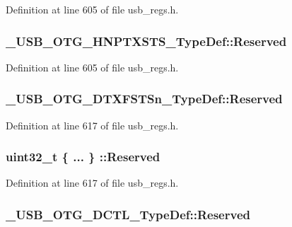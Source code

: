Definition at line 605 of file usb\-\_\-regs.\-h.

\hypertarget{group___u_s_b___o_t_g___d_r_i_v_e_r_ga0b02a3404c6ad41176f49181c017ca7c}{
\subsubsection[{Reserved}]{ \-\_\-\-U\-S\-B\-\_\-\-O\-T\-G\-\_\-\-H\-N\-P\-T\-X\-S\-T\-S\-\_\-\-Type\-Def\-::\-Reserved}}\label{group___u_s_b___o_t_g___d_r_i_v_e_r_ga0b02a3404c6ad41176f49181c017ca7c}


Definition at line 605 of file usb\-\_\-regs.\-h.

\hypertarget{group___u_s_b___o_t_g___d_r_i_v_e_r_gac897a0ce4a1b6cdba39c3fcf36948dc8}{
\subsubsection[{Reserved}]{ \-\_\-\-U\-S\-B\-\_\-\-O\-T\-G\-\_\-\-D\-T\-X\-F\-S\-T\-Sn\-\_\-\-Type\-Def\-::\-Reserved}}\label{group___u_s_b___o_t_g___d_r_i_v_e_r_gac897a0ce4a1b6cdba39c3fcf36948dc8}


Definition at line 617 of file usb\-\_\-regs.\-h.

\hypertarget{group___u_s_b___o_t_g___d_r_i_v_e_r_gae2017124fdc0bcea2fbb6d8605b9e90d}{
\subsubsection[{Reserved}]{\setlength{\rightskip}{0pt plus 5cm}uint32\-\_\-t \{ ... \} \-::Reserved}}\label{group___u_s_b___o_t_g___d_r_i_v_e_r_gae2017124fdc0bcea2fbb6d8605b9e90d}


Definition at line 617 of file usb\-\_\-regs.\-h.

\hypertarget{group___u_s_b___o_t_g___d_r_i_v_e_r_ga5e233f2b38a4586c46fc4b90ec1a5490}{
\subsubsection[{Reserved}]{ \-\_\-\-U\-S\-B\-\_\-\-O\-T\-G\-\_\-\-D\-C\-T\-L\-\_\-\-Type\-Def\-::\-Reserved}}\label{group___u_s_b___o_t_g___d_r_i_v_e_r_ga5e233f2b38a4586c46fc4b90ec1a5490}


